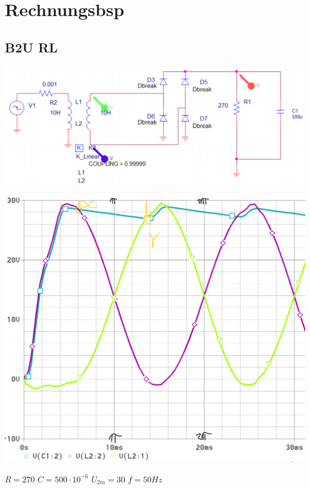 \section{Rechnungsbsp}
\subsection{B2U RL}
\begin{minipage}{0.4\linewidth}
    \includegraphics[width=\linewidth]{images/Rechnungsbsp/B2URC}
\end{minipage}
\begin{minipage}{0.2\linewidth}
    \includegraphics[width=\linewidth]{images/Rechnungsbsp/B2URCKl}
\end{minipage}
\begin{minipage}{5cm}
   $ R = 270 $ \newline
   $ C = 500 \cdot 10^{-6} $\newline
   $ U_{2m} = 30 $ \newline
   $ f = 50 Hz $   
\end{minipage}
